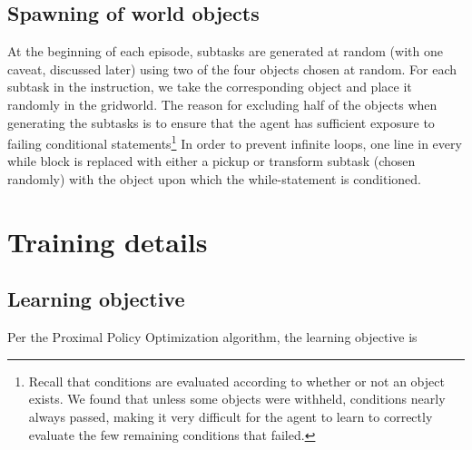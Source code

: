 \documentclass{article}
\begin{document}
\subsection{Spawning of world objects}
At the beginning of each episode, subtasks are generated at random (with one caveat, discussed later) using two of the four objects  chosen at random. 
For each subtask in the instruction, we take the corresponding object and place
it randomly in the gridworld. The reason for excluding half of the objects when
generating the subtasks is to ensure that the agent has sufficient exposure to
failing conditional statements\footnote{Recall that conditions are evaluated
according to whether or not an object exists. We found that unless some objects
were withheld, conditions nearly always passed, making it very difficult for the agent to learn to correctly evaluate the few remaining conditions that failed.} In order to prevent infinite loops, one line in every while block is replaced with either a pickup or transform subtask (chosen randomly) with the object upon which the while-statement is conditioned. 


\section{Training details}
\label{training}
\subsection{Learning objective}
Per the Proximal Policy Optimization algorithm, the learning objective is
\end{document}
